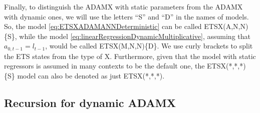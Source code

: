 \documentclass[]{book}
\theoremstyle{definition}
\theoremstyle{definition}
\theoremstyle{definition}
\theoremstyle{definition}
\theoremstyle{remark}
\begin{document}
Finally, to distinguish the ADAMX with static parameters from the ADAMX with dynamic ones, we will use the letters ``S'' and ``D'' in the names of models. So, the model \eqref{eq:ETSXADAMANNDeterministic} can be called ETSX(A,N,N)\{S\}, while the model \eqref{eq:linearRegressionDynamicMultiplicative}, assuming that \(a_{0,t-1}=l_{t-1}\), would be called ETSX(M,N,N)\{D\}. We use curly brackets to split the ETS states from the type of X. Furthermore, given that the model with static regressors is assumed in many contexts to be the default one, the ETSX(*,*,*)\{S\} model can also be denoted as just ETSX(*,*,*).

\hypertarget{ADAMXDynamicMoments}{%
\subsection{Recursion for dynamic ADAMX}\label{ADAMXDynamicMoments}}
\end{document}
